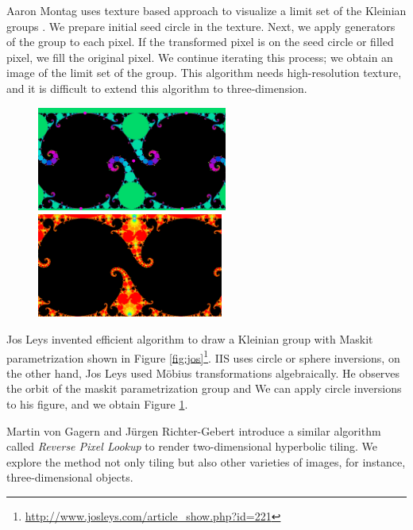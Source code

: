 Aaron Montag uses texture based approach to visualize a limit set of the
Kleinian groups \cite{Montag2014hyperbolicIFS}.
We prepare initial seed circle in the texture.
Next, we apply generators of the group to each pixel.
If the transformed pixel is on the seed circle or filled pixel, we fill the original pixel.
We continue iterating this process; we obtain an image of the limit set of
the group.
This algorithm needs high-resolution texture, and it is difficult to
extend this algorithm to three-dimension.

\begin{figure}[htbp]
 \begin{minipage}[t]{0.5\hsize}
  \center
  \includegraphics[height=1.35in, keepaspectratio]{img/preparation/related/josklein.png}
  \caption{\textit{}}
  \label{fig:jos}
  \hspace*{\fill}
 \end{minipage}
 \begin{minipage}[t]{0.5\hsize}
  \center
  \includegraphics[height=1.35in, keepaspectratio]{img/preparation/related/joskleinInv.png}
  \caption{\textit{}}
  \label{fig:josInv}
  \hspace*{\fill}
 \end{minipage}
\end{figure}

Jos Leys invented efficient algorithm to draw a Kleinian group with Maskit
parametrization shown in Figure \ref{fig:jos}\footnote{\url{http://www.josleys.com/article_show.php?id=221}}.
IIS uses circle or sphere inversions, on the other hand, Jos Leys used
M\"obius transformations algebraically.
He observes the orbit of the maskit parametrization group and 
We can apply circle inversions to his figure, and we obtain Figure \ref{fig:josInv}.

Martin von Gagern and Jürgen Richter-Gebert introduce a similar algorithm
called \textit{Reverse Pixel Lookup}
\cite{journals/combinatorics/GagernR09} to render two-dimensional hyperbolic tiling.
We explore the method not only tiling but also other varieties of
images, for instance, three-dimensional objects.

